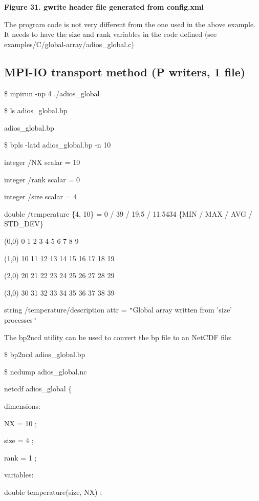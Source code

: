\leftskip=18pt
{\color{color20} \textbf{Figure 31. gwrite header file generated from config.xml}}

\leftskip=0pt
The program code is not very different from the one used in the above example. 
It needs to have the size and rank variables in the code defined (see examples/C/global-array/adios\_global.c) 
\label{HToc182553448}

\subsection{MPI-IO transport method (P writers, 1 file)}

\$ mpirun -np 4 ./adios\_global

\$ ls adios\_global.bp 

adios\_global.bp

\$  bpls -latd adios\_global.bp -n 10

integer    /NX                       scalar = 10

\parindent=3pt
integer    /rank                     scalar = 0

integer    /size                     scalar = 4

\parindent=7pt
double     /temperature              \{4, 10\} = 0 / 39 / 19.5 / 11.5434  \{MIN 
/ MAX / AVG / STD\_DEV\}

\parindent=14pt
(0,0)    0 1 2 3 4 5 6 7 8 9

(1,0)    10 11 12 13 14 15 16 17 18 19

\parindent=28pt
(2,0)    20 21 22 23 24 25 26 27 28 29

\parindent=14pt
(3,0)    30 31 32 33 34 35 36 37 38 39

\parindent=7pt
string     /temperature/description  attr   = \texttt{"}Global array written from 
'size' processes\texttt{"}

\parindent=0pt
The bp2ncd utility can be used to convert the bp file to an NetCDF file:

\$ bp2ncd adios\_global.bp

\$ ncdump adios\_global.nc 

netcdf adios\_global \{

dimensions:

\parindent=28pt
NX = 10 ;

size = 4 ;

\parindent=57pt
rank = 1 ;

\parindent=0pt
variables:

\parindent=28pt
double temperature(size, NX) ;

